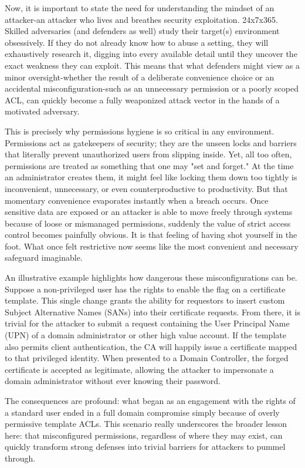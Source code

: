 {Now, it is important to state the need for understanding the mindset of an attacker-an attacker who lives and breathes security exploitation. 24x7x365. Skilled adversaries (and defenders as well) study their target(s) environment obsessively. If they do not already know how to abuse a setting, they will exhaustively research it, digging into every available detail until they uncover the exact weakness they can exploit. This means that what defenders might view as a minor oversight-whether the result of a deliberate convenience choice or an accidental misconfiguration-such as an unnecessary permission or a poorly scoped ACL, can quickly become a fully weaponized attack vector in the hands of a motivated adversary.

This is precisely why permissions hygiene is so critical in any environment. Permissions act as gatekeepers of security; they are the unseen locks and barriers that literally prevent unauthorized users from slipping inside. Yet, all too often, permissions are treated as something that one may "set and forget." At the time an administrator creates them, it might feel like locking them down too tightly is inconvenient, unnecessary, or even counterproductive to productivity. But that momentary convenience evaporates instantly when a breach occurs. Once sensitive data are exposed or an attacker is able to move freely through systems because of loose or mismanaged permissions, suddenly the value of strict access control becomes painfully obvious. It is that feeling of having shot yourself in the foot. What once felt restrictive now seems like the most convenient and necessary safeguard imaginable.

An illustrative example highlights how dangerous these misconfigurations can be. Suppose a non-privileged user has the rights to enable the flag \texttt{} on a certificate template. This single change grants the ability for requestors to insert custom Subject Alternative Names (SANs) into their certificate requests. From there, it is trivial for the attacker to submit a request containing the User Principal Name (UPN) of a domain administrator or other high value account. If the template also permits client authentication, the CA will happily issue a certificate mapped to that privileged identity. When presented to a Domain Controller, the forged certificate is accepted as legitimate, allowing the attacker to impersonate a domain administrator without ever knowing their password.

The consequences are profound: what began as an engagement with the rights of a standard user ended in a full domain compromise simply because of overly permissive template ACLs. This scenario really underscores the broader lesson here: that misconfigured permissions, regardless of where they may exist, can quickly transform strong defenses into trivial barriers for attackers to pummel through.

}

